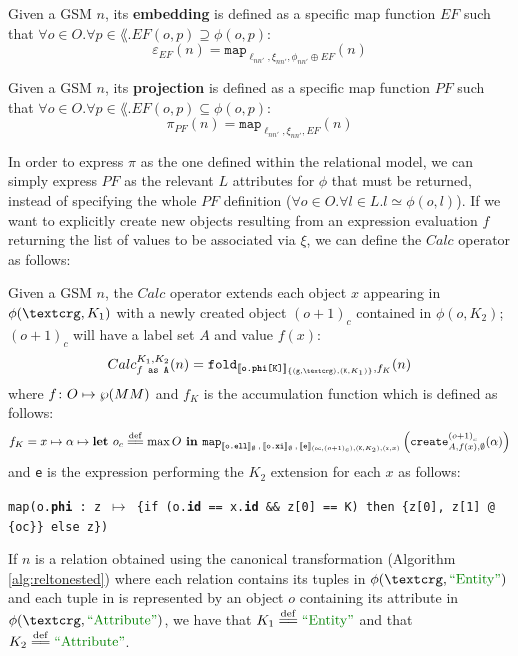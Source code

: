 \begin{definition}[Embedding]
	Given a GSM $n$, its \textbf{embedding} is defined as a specific map function $EF$ such that $\forall o\in O.\forall p\in\lang. EF(o,p)\supseteq \phi(o,p)$:
	\[\varepsilon_{EF}(n)=\texttt{map}_{\ell_{nn'},\xi_{nn'},\phi_{nn'}\oplus EF}(n)\]
\end{definition}

\begin{definition}[Projection]
	Given a GSM $n$, its \textbf{projection} is defined as a specific map function $PF$ such that $\forall o\in O.\forall p\in\lang. EF(o,p)\subseteq \phi(o,p)$:
	\[\pi_{PF}(n)=\texttt{map}_{\ell_{nn'},\xi_{nn'}, EF}(n)\]
\end{definition}

In order to express $\pi$ as the one defined within the relational model, we can simply express $PF$ as the relevant $L$ attributes for $\phi$ that must be returned, instead of specifying the whole $PF$ definition ($\forall o\in O. \forall  l\in L. l\simeq \phi(o,l)$). If we want to explicitly create new objects resulting from an expression evaluation $f$ returning the list of values to be associated via $\xi$, we can define the $Calc$ operator \cite{Calders2006} as follows:


\begin{definition}[Calc]\label{def:calc}
Given a GSM $n$, the $Calc$ operator extends each object $x$ appearing in $\phi(\ngraph,K_1)$ with a newly created object $(o+1)_c$ contained in $\phi(o,K_2)$; $(o+1)_c$ will have a  label set $A$ and value $f(x)$:
\[Calc_{f\texttt{ as A}}^{K_1,K_2}(n)=\texttt{fold}_{\jsem{\texttt{o.\textbf{phi}[K]}}_{\{(\texttt{g},\ngraph),(\texttt{K},K_1)\}},f_K}(n)\]
where $f\colon O\mapsto\partof{\metamodel}$ and $f_K$ is the accumulation function which is defined as follows:
\[f_K=x\mapsto \alpha\mapsto \textbf{let }o_c\overset{\mathrm{def}}{=\mathrel{\mkern-3mu}=}\max O\textbf{ in }\texttt{map}_{[\! [\texttt{o.\textbf{ell}}]\!]_{\emptyset}\,,\,[\! [\texttt{o.\textbf{xi}}]\!]_{\emptyset}\,,\,[\! [\texttt{e}]\!]_{(\texttt{oc},(o+1)_c),(\texttt{K},K_2),(\texttt{x},x)}}\left(\texttt{create}^{{(o+1)}_c}_{A,f(x),\emptyset}(\alpha)\right)\]
and \texttt{e} is the expression performing the $K_2$ extension for each $x$ as follows:
\begin{center}
\texttt{map(o.\textbf{phi} : z $\mapsto$ \{if (o.\textbf{id} == x.\textbf{id} \&\& z[0] == K) then \{z[0], z[1] @ \{oc\}\} else z\})}
\end{center}

\end{definition}
If $n$ is a relation obtained using the canonical transformation (Algorithm \vref{alg:reltonested}) where each relation contains its tuples in $\phi(\ngraph,\ONTA)$ and each tuple in is represented by an object $o$ containing its attribute in  $\phi(\ngraph,\mstr{Attribute})$, we have that $K_1\eqdef\ONTA$ and that $K_2\eqdef \mstr{Attribute}$.

